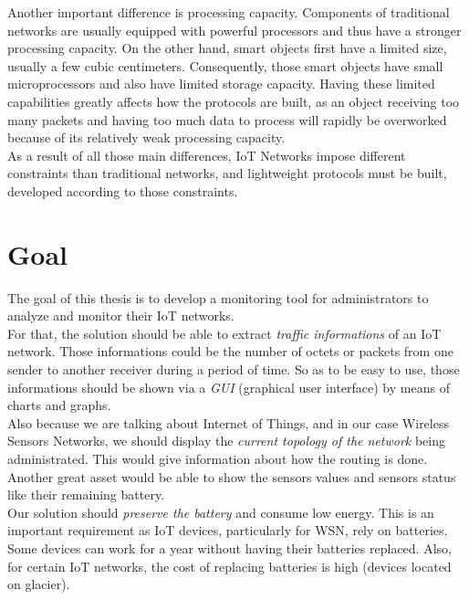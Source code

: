 Another important difference is processing capacity. Components of traditional networks are usually equipped with powerful processors and thus have a stronger processing capacity. On the other hand, smart objects first have a limited size, usually a few cubic centimeters. Consequently, those smart objects have small microprocessors and also have limited storage capacity. Having these limited capabilities greatly affects how the protocols are built, as an object receiving too many packets and having too much data to process will rapidly be overworked because of its relatively weak processing capacity. \\

As a result of all those main differences, IoT Networks impose different constraints than traditional networks, and lightweight protocols must be built, developed according to those constraints.

\section*{Goal}

The goal of this thesis is to develop a monitoring tool for administrators to analyze and monitor their IoT networks.\\

For that, the solution should be able to extract \textit{traffic informations} of an IoT network. Those informations could be the number of octets or packets from one sender to another receiver during a period of time. So as to be easy to use, those informations should be shown via a \textit{GUI} (graphical user interface) by means of charts and graphs. \\

Also because we are talking about Internet of Things, and in our case Wireless Sensors Networks, we should display the \textit{current topology of the network} being administrated. This would give information about how the routing is done. Another great asset would be able to show the sensors values and sensors status like their remaining battery.\\

Our solution should \textit{preserve the battery} and consume low energy. This is an important requirement as IoT devices, particularly for WSN, rely on batteries. Some devices can work for a year without having their batteries replaced. Also, for certain IoT networks, the cost of replacing batteries is high (devices located on glacier).\\


